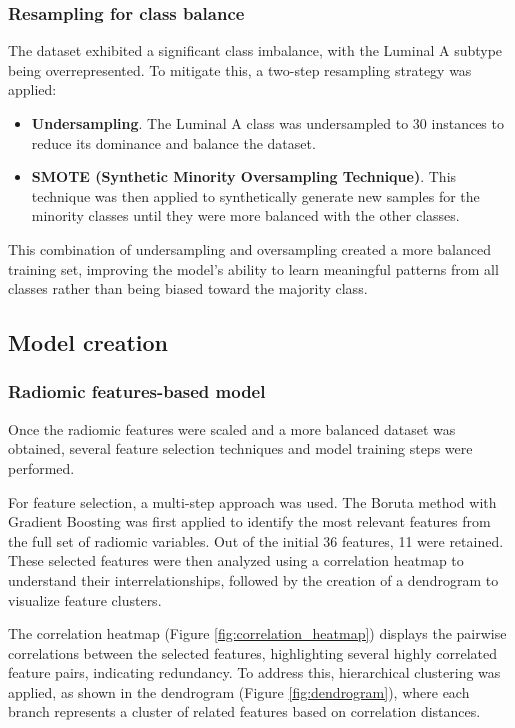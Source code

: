 \documentclass[conference]{IEEEtran}
\begin{document}
\subsubsection{Resampling for class balance} \label{pre-models}

The dataset exhibited a significant class imbalance, with the Luminal A subtype being overrepresented. To mitigate this, a two-step resampling strategy was applied:

\begin{itemize}
	\item \textbf{Undersampling}. The Luminal A class was undersampled to 30 instances to reduce its dominance and balance the dataset.

	\item \textbf{SMOTE (Synthetic Minority Oversampling Technique)}. This technique was then applied to synthetically generate new samples for the minority classes until they were more balanced with the other classes.
\end{itemize}

This combination of undersampling and oversampling created a more balanced training set, improving the model’s ability to learn meaningful patterns from all classes rather than being biased toward the majority class.

\subsection{Model creation} \label{models}

\subsubsection{Radiomic features-based model}

Once the radiomic features were scaled and a more balanced dataset was obtained, several feature selection techniques and model training steps were performed.

For feature selection, a multi-step approach was used. The Boruta method with Gradient Boosting was first applied to identify the most relevant features from the full set of radiomic variables. Out of the initial 36 features, 11 were retained. These selected features were then analyzed using a correlation heatmap to understand their interrelationships, followed by the creation of a dendrogram to visualize feature clusters.

The correlation heatmap (Figure \ref{fig:correlation_heatmap}) displays the pairwise correlations between the selected features, highlighting several highly correlated feature pairs, indicating redundancy. To address this, hierarchical clustering was applied, as shown in the dendrogram (Figure \ref{fig:dendrogram}), where each branch represents a cluster of related features based on correlation distances.
\end{document}
